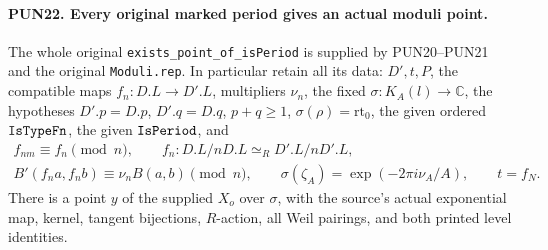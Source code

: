\documentclass[11pt,a4paper]{article}
\numberwithin{equation}{section}
\theoremstyle{remark}\newtheorem{remark}[theorem]{Remark}
\begin{document}
\paragraph{PUN22. Every original marked period gives an actual moduli point.}
\label{claim:PUN22}
The whole original \texttt{exists\_\allowbreak point\_\allowbreak of\_\allowbreak is\allowbreak Period} is
supplied by PUN20--PUN21 and the original \texttt{Moduli.\allowbreak rep}.
In particular retain all its data: \(D',t,P\), the compatible
maps \(f_n:D.L\to D'.L\), multipliers \(\nu_n\), the fixed
\(\sigma:K_A(l)\to\mathbb C\), the hypotheses
\(D'.p=D.p\), \(D'.q=D.q\), \(p+q\ge1\),
\(\sigma(\rho)=\mathrm{rt}_0\), the given ordered
\(\texttt{Is\allowbreak Type\allowbreak Fn}\), the given \(\texttt{Is\allowbreak Period}\), and
\[
 \begin{gathered}
 f_{nm}\equiv f_n\pmod n,\qquad
 f_n:D.L/nD.L\simeq_R D'.L/nD'.L,\\
 B'(f_na,f_nb)\equiv\nu_nB(a,b)\pmod n,\qquad
 \sigma(\zeta_A)=\exp(-2\pi i\nu_A/A),\qquad t=f_N.
 \end{gathered}                                                   \tag{PUN.39}
\]
There is a point \(y\) of the supplied \(X_o\) over
\(\sigma\), with the source's actual exponential map,
kernel, tangent bijections, \(R\)-action, all Weil pairings,
and both printed level identities.
\end{document}
